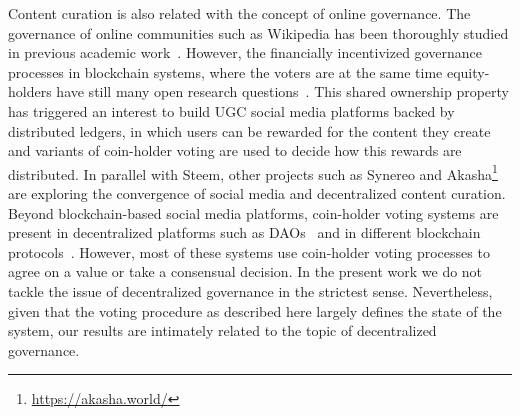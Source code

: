   Content curation is also related with the concept of online governance. The governance of online communities such as Wikipedia has been thoroughly studied in previous academic work~\cite{leskovec2010governance,forte2008scaling}. However, the financially incentivized governance processes in blockchain systems, where the voters are at the same time equity-holders have still many open research questions~\cite{vitalik,ehrsam}. This shared ownership property has triggered an interest to build UGC social media platforms backed by distributed ledgers, in which users can be rewarded for the content they create and variants of coin-holder voting are used to decide how this rewards are distributed. In parallel with Steem, other projects such as Synereo\cite{synereo} and Akasha\footnote{\url{https://akasha.world/}} are exploring the convergence of social media and decentralized content curation.
   Beyond blockchain-based social media platforms, coin-holder voting systems are present in decentralized platforms such as DAOs~\cite{darkdaos} and in different blockchain protocols~\cite{tezos}. However, most of these systems use coin-holder voting processes to agree on a value or take a consensual decision.
    In the present work we do not tackle the issue of decentralized governance in the strictest sense. Nevertheless, given that the voting procedure as described here largely defines the state of the system, our results are intimately related to the topic of decentralized governance.
